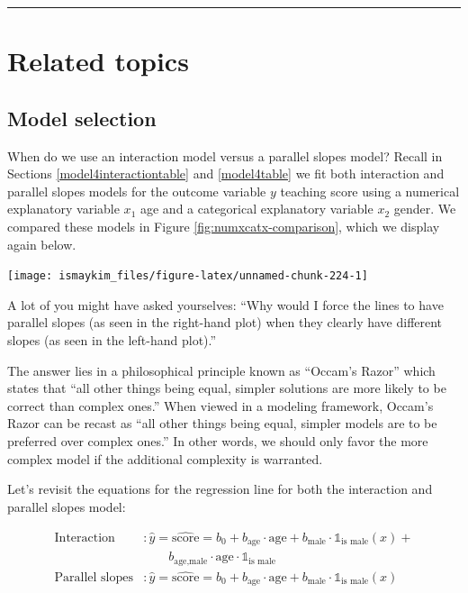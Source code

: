 \documentclass[12pt, krantz2,]{krantz}
\begin{document}
\begin{center}\rule{0.5\linewidth}{\linethickness}\end{center}

\hypertarget{related-topics-1}{%
\section{Related topics}\label{related-topics-1}}

\hypertarget{model-selection}{%
\subsection{Model selection}\label{model-selection}}

When do we use an interaction model versus a parallel slopes model? Recall in Sections \ref{model4interactiontable} and \ref{model4table} we fit both interaction and parallel slopes models for the outcome variable \(y\) teaching score using a numerical explanatory variable \(x_1\) age and a categorical explanatory variable \(x_2\) gender. We compared these models in Figure \ref{fig:numxcatx-comparison}, which we display again below.

\begin{center}\texttt{[image: ismaykim\_files/figure-latex/unnamed-chunk-224-1]} \end{center}

A lot of you might have asked yourselves: ``Why would I force the lines to have parallel slopes (as seen in the right-hand plot) when they clearly have different slopes (as seen in the left-hand plot).''

The answer lies in a philosophical principle known as ``Occam's Razor'' which states that ``all other things being equal, simpler solutions are more likely to be correct than complex ones.'' When viewed in a modeling framework, Occam's Razor can be recast as ``all other things being equal, simpler models are to be preferred over complex ones.'' In other words, we should only favor the more complex model if the additional complexity is warranted.

Let's revisit the equations for the regression line for both the interaction and parallel slopes model:

\[
\begin{aligned}
\text{Interaction} &: \widehat{y} = \widehat{\text{score}} = b_0 + b_{\mbox{age}} \cdot \mbox{age} + b_{\mbox{male}} \cdot \mathbb{1}_{\mbox{is male}}(x) + \\
& \qquad b_{\mbox{age,male}} \cdot \mbox{age} \cdot \mathbb{1}_{\mbox{is male}}\\
\text{Parallel slopes} &: \widehat{y} = \widehat{\text{score}} = b_0 + b_{\mbox{age}} \cdot \mbox{age} + b_{\mbox{male}} \cdot \mathbb{1}_{\mbox{is male}}(x)
\end{aligned}
\]
\end{document}
